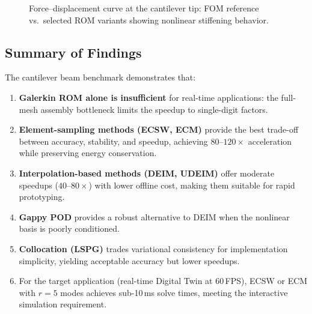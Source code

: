 \begin{figure}[H]
\centering
{}
\caption{Force--displacement curve at the cantilever tip: FOM reference vs.\ selected ROM variants showing nonlinear stiffening behavior.}
\label{fig:force-disp}
\end{figure}

\subsection{Summary of Findings}

The cantilever beam benchmark demonstrates that:
\begin{enumerate}
    \item \textbf{Galerkin ROM alone is insufficient} for real-time applications: the full-mesh assembly bottleneck limits the speedup to single-digit factors.
    \item \textbf{Element-sampling methods (ECSW, ECM)} provide the best trade-off between accuracy, stability, and speedup, achieving $80\text{--}120\times$ acceleration while preserving energy conservation.
    \item \textbf{Interpolation-based methods (DEIM, UDEIM)} offer moderate speedups ($40\text{--}80\times$) with lower offline cost, making them suitable for rapid prototyping.
    \item \textbf{Gappy POD} provides a robust alternative to DEIM when the nonlinear basis is poorly conditioned.
    \item \textbf{Collocation (LSPG)} trades variational consistency for implementation simplicity, yielding acceptable accuracy but lower speedups.
    \item For the target application (real-time Digital Twin at 60\,FPS), ECSW or ECM with $r = 5$ modes achieves sub-10\,ms solve times, meeting the interactive simulation requirement.
\end{enumerate}


